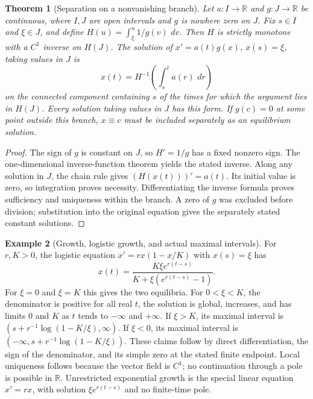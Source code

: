 \documentclass[11pt,oneside]{book}
\newtheorem{theorem}{Theorem}[chapter]
\theoremstyle{definition}
\newtheorem{example}[theorem]{Example}
\theoremstyle{remark}\newtheorem{remark}[theorem]{Remark}
\newcommand{\R}{\mathbb R}\newcommand{\C}{\mathbb C}
\newcommand{\dd}{\,d}\newcommand{\id}{\operatorname{id}}
\begin{document}
\begin{theorem}[Separation on a nonvanishing branch]\label{d13:02:separable}
Let $a:I\to\R$ and $g:J\to\R$ be continuous, where $I,J$ are open
intervals and $g$ is nowhere zero on $J$. Fix $s\in I$ and $\xi\in J$,
and define $H(u)=\int_\xi^u 1/g(v)\,\dd v$. Then $H$ is strictly
monotone with a $C^1$ inverse on $H(J)$. The solution of
$x'=a(t)g(x)$, $x(s)=\xi$, taking values in $J$ is
\[
 x(t)=H^{-1}\left(\int_s^t a(r)\,\dd r\right)
\]
on the connected component containing $s$ of the times for which the
argument lies in $H(J)$. Every solution taking values in $J$ has this
form. If $g(c)=0$ at some point outside this branch, $x\equiv c$ must
be included separately as an equilibrium solution.
\end{theorem}
\begin{proof}
The sign of $g$ is constant on $J$, so $H'=1/g$ has a fixed nonzero
sign. The one-dimensional inverse-function theorem yields the stated
inverse. Along any solution in $J$, the chain rule gives
$(H(x(t)))'=a(t)$. Its initial value is zero, so integration proves
necessity. Differentiating the inverse formula proves sufficiency and
uniqueness within the branch. A zero of $g$ was excluded before division;
substitution into the original equation gives the separately stated
constant solutions.
\end{proof}

\begin{example}[Growth, logistic growth, and actual maximal intervals]\label{d13:02:logistic}
For $r,K>0$, the logistic equation $x'=rx(1-x/K)$ with $x(s)=\xi$
has
\[
 x(t)=\frac{K\xi e^{r(t-s)}}{K+\xi(e^{r(t-s)}-1)}.
\]
For $\xi=0$ and $\xi=K$ this gives the two equilibria. For
$0<\xi<K$, the denominator is positive for all real $t$, the solution
is global, increases, and has limits $0$ and $K$ as $t$ tends to
$-\infty$ and $+\infty$. If $\xi>K$, its maximal interval is
$(s+r^{-1}\log(1-K/\xi),\infty)$. If $\xi<0$, its maximal interval is
$(-\infty,s+r^{-1}\log(1-K/\xi))$. These claims follow by direct
differentiation, the sign of the denominator, and its simple zero at the
stated finite endpoint. Local uniqueness follows because the vector field
is $C^1$; no continuation through a pole is possible in $\R$.
Unrestricted exponential growth is the special linear equation $x'=rx$,
with solution $\xi e^{r(t-s)}$ and no finite-time pole.
\end{example}
\end{document}
